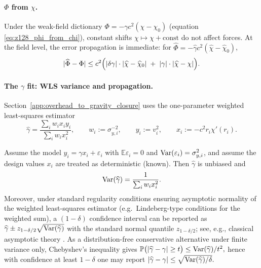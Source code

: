 \paragraph{\texorpdfstring{$\Phi$}{Phi} from \texorpdfstring{$\chi$}{chi}.}
Under the weak-field dictionary $\Phi=-\gamma c^2(\chi-\chi_0)$ (equation \eqref{eq:z128_phi_from_chi}),
constant shifts $\chi\mapsto\chi+\mathrm{const}$ do not affect forces.
At the field level, the error propagation is immediate:
for $\widehat\Phi=-\widehat\gamma c^2(\widehat\chi-\widehat\chi_0)$,
\[
|\widehat\Phi-\Phi|
\le
c^2\Bigl(|\delta\gamma|\cdot|\widehat\chi-\widehat\chi_0|
\;+\;|\gamma|\cdot|\widehat\chi-\chi|
\Bigr).
\]

\paragraph{The \texorpdfstring{$\gamma$}{gamma} fit: WLS variance and propagation.}
Section~\ref{app:overhead_to_gravity_closure} uses the one-parameter weighted least-squares estimator
\[
\widehat\gamma=\frac{\sum_i w_i x_i y_i}{\sum_i w_i x_i^2},
\qquad
w_i:=\sigma_{y,i}^{-2},
\qquad
y_i:=v_i^2,
\qquad
x_i:=-c^2 r_i \chi'(r_i).
\]

\begin{proposition}\label{prop:wls_gamma_variance}
Assume the model $y_i=\gamma x_i+\varepsilon_i$ with $\mathbb{E}\varepsilon_i=0$ and $\mathrm{Var}(\varepsilon_i)=\sigma_{y,i}^2$, and assume the design values $x_i$ are treated as deterministic (known).
Then $\widehat\gamma$ is unbiased and
\[
\mathrm{Var}(\widehat\gamma)=\frac{1}{\sum_i w_i x_i^2}.
\]
Moreover, under standard regularity conditions ensuring asymptotic normality of the weighted least-squares estimator (e.g.\ Lindeberg-type conditions for the weighted sum), a $(1-\delta)$ confidence interval can be reported as
$
\widehat\gamma \pm z_{1-\delta/2}\sqrt{\mathrm{Var}(\widehat\gamma)}
$
with the standard normal quantile $z_{1-\delta/2}$; see, e.g., classical asymptotic theory \cite{vanDerVaart1998}.
As a distribution-free conservative alternative under finite variance only, Chebyshev's inequality gives
$
\mathbb{P}\bigl(|\widehat\gamma-\gamma|\ge t\bigr)\le \mathrm{Var}(\widehat\gamma)/t^2,
$
hence with confidence at least $1-\delta$ one may report
$
|\widehat\gamma-\gamma|\le \sqrt{\mathrm{Var}(\widehat\gamma)/\delta}.
$
\end{proposition}

